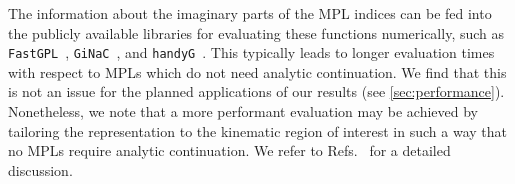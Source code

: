\documentclass[main.tex]{subfiles}
\begin{document}
\smallskip

The information about the imaginary parts of the MPL indices can be fed into the publicly available libraries for evaluating these functions numerically, such as \texttt{FastGPL}~\cite{Wang:2021imw}, \texttt{GiNaC}~\cite{Bauer:2000cp,Vollinga:2004sn}, and \texttt{handyG}~\cite{Naterop:2019xaf}. This typically leads to longer evaluation times with respect to MPLs which do not need analytic continuation. We find that this is not an issue for the planned applications of our results (see \cref{sec:performance}). Nonetheless, we note that a more performant evaluation may be achieved by tailoring the representation to the kinematic region of interest in such a way that no MPLs require analytic continuation. We refer to Refs.~\cite{Gehrmann:2002zr, Gehrmann:2023etk} for a detailed discussion. 
\end{document}
